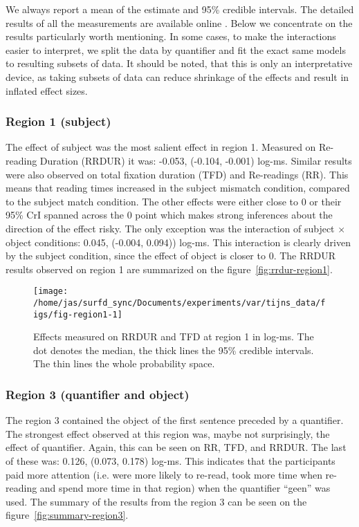 
We always report a mean of the estimate and 95\% credible intervals.
The detailed results of all the measurements are available online \cite{osf-repo}. Below we concentrate on the results particularly worth mentioning.
In some cases, to make the interactions easier to interpret, we split the data by quantifier and fit the exact same models to resulting subsets of data. It should be noted, that this is only an interpretative device, as taking subsets of data can reduce shrinkage of the effects and result in inflated effect sizes.



\subsubsection{Region 1 (subject)}

The effect of subject was the most salient effect in region 1.
Measured on Re-reading Duration (RRDUR) it was: -0.053, (-0.104, -0.001) log-ms. Similar results were also observed on
total fixation duration (TFD) and
Re-readings (RR). This means that reading times increased in the subject
mismatch condition, compared to the subject match condition. The other effects
were either close to 0 or their 95\% CrI spanned across the 0 point which makes
strong inferences about the direction of the effect risky. The only exception
was the interaction of subject $\times$ object conditions: 0.045, (-0.004, 0.094)) log-ms. This interaction is clearly driven by the subject condition, since the
effect of object is closer to 0. The RRDUR results observed on region 1 are
summarized on the figure~\ref{fig:rrdur-region1}.

\begin{knitrout}
\color{fgcolor}\begin{figure}
\texttt{[image: /home/jas/surfd\_sync/Documents/experiments/var/tijns\_data/figs/fig-region1-1]} \caption{\label{fig:rrdur-region1}Effects measured on RRDUR and TFD at region 1 in log-ms. The dot denotes the median, the thick lines the 95\% credible intervals. The thin lines the whole probability space.}\label{fig:fig-region1}
\end{figure}

\end{knitrout}


\subsubsection{Region 3 (quantifier and object)}
The region 3 contained the object of the first
sentence preceded by a quantifier. The strongest effect observed at this region
was, maybe not surprisingly, the effect of quantifier. Again, this can be seen on RR, TFD, and RRDUR.
The last of these was: 0.126, (0.073, 0.178) log-ms. This indicates
that the participants paid more attention (i.e. were more likely to re-read, took more time when re-reading and spend more time in that region) when the quantifier ``geen'' was used. The summary of the results from the region 3 can be seen on the figure~\ref{fig:summary-region3}.

